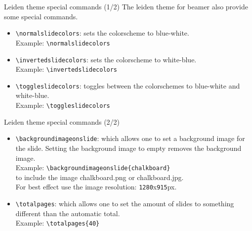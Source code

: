 \documentclass[t,11pt]{beamer}
\begin{document}
\begin{frame}[fragile]{Leiden theme special commands (1/2)}
The leiden theme for beamer also provide some special commands.
\begin{itemize}
\item	\alert{\texttt{\textbackslash normalslidecolors}}: sets the
		colorscheme to blue-white.\\
\vspace{0.1\baselineskip}
		Example: \verb|\normalslidecolors|\\
\vspace{0.5\baselineskip}

\item	\alert{\texttt{\textbackslash invertedslidecolors}}: sets the
		colorscheme to white-blue.\\
\vspace{0.1\baselineskip}
		Example: \verb|\invertedslidecolors|\\
\vspace{0.5\baselineskip}

\item	\alert{\texttt{\textbackslash toggleslidecolors}}: toggles between
		the colorschemes to blue-white and white-blue.\\
\vspace{0.1\baselineskip}
		Example: \verb|\toggleslidecolors|\\
\end{itemize}
\end{frame}

\begin{frame}[fragile]{Leiden theme special commands (2/2)}
\begin{itemize}
\item	\alert{\texttt{\textbackslash backgroundimageonslide}}: which
		allows one to set a background image for the slide.
		Setting the background image to empty removes the
		background image.\\
\vspace{0.2\baselineskip}
		Example: \verb|\backgroundimageonslide{chalkboard}|\\
\vspace{0.1\baselineskip}
		to include the image chalkboard.png or chalkboard.jpg.\\
		For best effect use the image resolution: \texttt{1280}x\texttt{915}px.
\vspace{0.5\baselineskip}

\item	\alert{\texttt{\textbackslash totalpages}}: which allows
		one to set the amount of slides to something different
		than the automatic total.\\
\vspace{0.2\baselineskip}
		Example: \verb|\totalpages{40}|
\end{itemize}
\end{frame}
\end{document}
